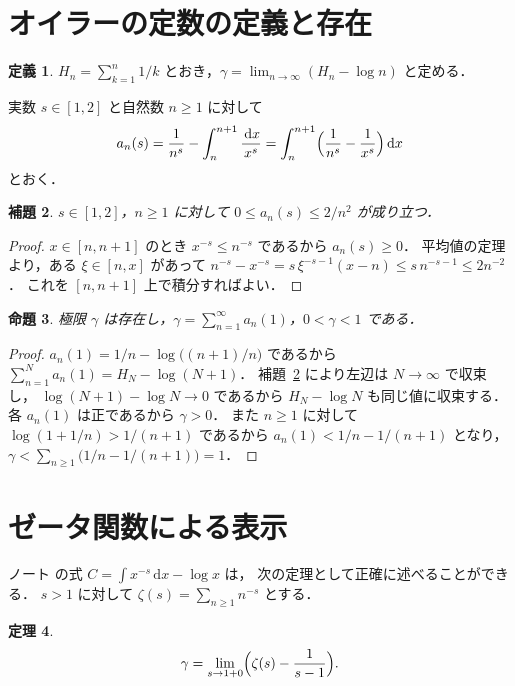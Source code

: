\documentclass[a4paper,11pt]{ltjsarticle}
\theoremstyle{plain}
\newtheorem{theorem}{定理}[section]
\newtheorem{proposition}[theorem]{命題}
\newtheorem{lemma}[theorem]{補題}
\theoremstyle{definition}
\newtheorem{definition}[theorem]{定義}
\newcommand{\dd}{\,\mathrm{d}}
\begin{document}
\section{オイラーの定数の定義と存在}

\begin{definition}
$H_n=\sum_{k=1}^{n}1/k$ とおき，$\gamma=\lim_{n\to\infty}(H_n-\log n)$ と定める．
\end{definition}

実数 $s\in[1,2]$ と自然数 $n\ge1$ に対して
\[
  a_n(s)=\frac{1}{n^{s}}-\int_n^{n+1}\frac{\dd x}{x^{s}}
        =\int_n^{n+1}\Bigl(\frac{1}{n^{s}}-\frac{1}{x^{s}}\Bigr)\dd x
\]
とおく．

\begin{lemma}\label{lem:bound}
$s\in[1,2]$，$n\ge1$ に対して $0\le a_n(s)\le 2/n^{2}$ が成り立つ．
\end{lemma}

\begin{proof}
$x\in[n,n+1]$ のとき $x^{-s}\le n^{-s}$ であるから $a_n(s)\ge0$．
平均値の定理より，ある $\xi\in[n,x]$ があって
$n^{-s}-x^{-s}=s\,\xi^{-s-1}(x-n)\le s\,n^{-s-1}\le 2n^{-2}$．
これを $[n,n+1]$ 上で積分すればよい．
\end{proof}

\begin{proposition}\label{prop:exist}
極限 $\gamma$ は存在し，$\gamma=\sum_{n=1}^{\infty}a_n(1)$，$0<\gamma<1$ である．
\end{proposition}

\begin{proof}
$a_n(1)=1/n-\log\bigl((n+1)/n\bigr)$ であるから
$\sum_{n=1}^{N}a_n(1)=H_N-\log(N+1)$．
補題~\ref{lem:bound} により左辺は $N\to\infty$ で収束し，
$\log(N+1)-\log N\to0$ であるから $H_N-\log N$ も同じ値に収束する．
各 $a_n(1)$ は正であるから $\gamma>0$．
また $n\ge1$ に対して $\log(1+1/n)>1/(n+1)$ であるから
$a_n(1)<1/n-1/(n+1)$ となり，$\gamma<\sum_{n\ge1}\bigl(1/n-1/(n+1)\bigr)=1$．
\end{proof}

\section{ゼータ関数による表示}

ノート \cite{Note} の式 $C=\int x^{-s}\dd x-\log x$ は，
次の定理として正確に述べることができる．
$s>1$ に対して $\zeta(s)=\sum_{n\ge1}n^{-s}$ とする．

\begin{theorem}\label{thm:zeta}
\[
  \gamma=\lim_{s\to1+0}\Bigl(\zeta(s)-\frac{1}{s-1}\Bigr).
\]
\end{theorem}
\end{document}

